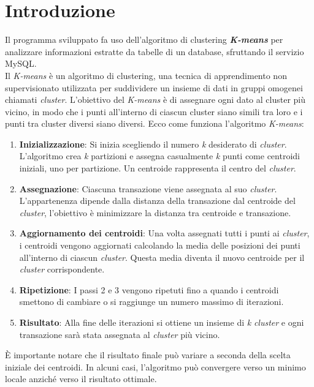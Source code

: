 \section{Introduzione}

Il programma sviluppato fa uso dell'algoritmo di clustering \textbf{\textit{K-means}} per analizzare informazioni estratte da tabelle di un database, sfruttando il servizio MySQL.
\\ Il \textit{K-means} è un algoritmo di clustering, una tecnica di apprendimento non supervisionato utilizzata per suddividere un insieme di dati in gruppi omogenei chiamati \textit{cluster}. 
L'obiettivo del \textit{K-means} è di assegnare ogni dato al cluster più vicino, in modo che i punti all'interno di ciascun cluster siano simili tra loro e i punti tra cluster diversi siano diversi. 
Ecco come funziona l'algoritmo \textit{K-means}: 
\begin{enumerate}
  \item \textbf{Inizializzazione}: Si inizia scegliendo il numero \textit{k} desiderato di \textit{cluster}. L'algoritmo crea \textit{k} partizioni e assegna casualmente \textit{k} punti come centroidi iniziali, uno per partizione. Un centroide rappresenta il centro del \textit{cluster}.
  \item \textbf{Assegnazione}: Ciascuna transazione viene assegnata al suo \textit{cluster}. L'appartenenza  dipende dalla distanza della transazione dal centroide del \textit{cluster}, l'obiettivo è minimizzare la distanza tra centroide e transazione.
  \item \textbf{Aggiornamento dei centroidi}: Una volta assegnati tutti i punti ai \textit{cluster}, i centroidi vengono aggiornati calcolando la media delle posizioni dei punti all'interno di ciascun \textit{cluster}. Questa media diventa il nuovo centroide per il \textit{cluster} corrispondente.
  \item \textbf{Ripetizione}: I passi 2 e 3 vengono ripetuti fino a quando i centroidi smettono di cambiare o si raggiunge un numero massimo di iterazioni.
  \item \textbf{Risultato}: Alla fine delle iterazioni si ottiene un insieme di \textit{k} \textit{cluster} e ogni transazione sarà stata assegnata al \textit{cluster} più vicino.
\end{enumerate}

\noindent È importante notare che il risultato finale può variare a seconda della scelta iniziale dei centroidi. In alcuni casi, l'algoritmo può convergere verso un minimo locale anziché verso il risultato ottimale. 